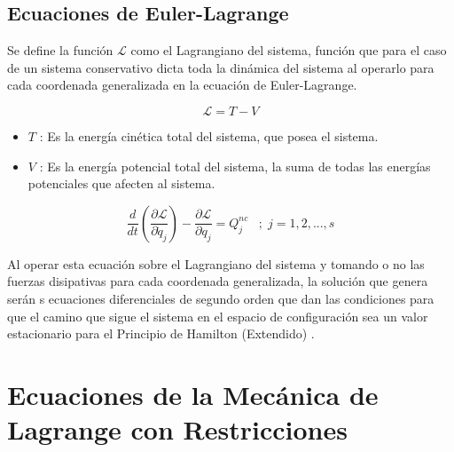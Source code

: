 \documentclass[/home/hernan-barquero/Documents/Apuntes_mecanica_teorica/main.tex]{subfiles}
\begin{document}
    \subsection{Ecuaciones de Euler-Lagrange}

    \begin{definition}
        Se define la función $\mathcal{L}$ como el Lagrangiano del sistema, función que para el caso de un sistema conservativo dicta toda la dinámica del sistema al operarlo para cada coordenada generalizada en la ecuación de Euler-Lagrange.

        \begin{equation}
            \mathcal{L} = T - V
            \label{eq: Lagrangiano}
        \end{equation}

        \begin{itemize}
            \item $T$ : Es la energía cinética total del sistema, que posea el sistema.
            \item $V$ : Es la energía potencial total del sistema, la suma de todas las energías potenciales que afecten al sistema.
        \end{itemize}
        
    \end{definition}

    \begin{definition} 
        
        \begin{equation}
            \frac{d}{d t} \left(\frac{\partial \mathcal{L} }{\partial \dot{q}_{j}} \right) - \frac{\partial \mathcal{L}}{\partial q_{j}} =  Q_{j}^{nc} \; \; \; ; \; j=1,2,...,s
            \label{eq: eqlagrange}
        \end{equation}

        Al operar esta ecuación sobre el Lagrangiano del sistema y tomando o no las fuerzas disipativas para cada coordenada generalizada, la solución que genera serán s ecuaciones diferenciales de segundo orden que dan las condiciones para que el camino que sigue el sistema en el espacio de configuración sea un valor estacionario para el Principio de Hamilton (Extendido) .
        
    \end{definition}

    \section{Ecuaciones de la Mecánica de Lagrange con Restricciones}
\end{document}
